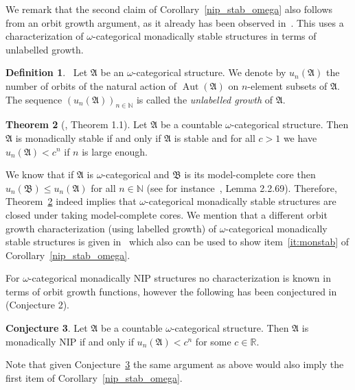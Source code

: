 \documentclass{amsart}
\theoremstyle{definition}
\newtheorem{theorem}{Theorem}[section]
\newtheorem{definition}[theorem]{Definition}
\newtheorem{conjecture}[theorem]{Conjecture}
\theoremstyle{remark}
\numberwithin{equation}{section}
\newcommand{\aut}{\operatorname{Aut}}
\newcommand{\fa}{\mathfrak{A}}
\newcommand{\fb}{\mathfrak{B}}
\begin{document}
	We remark that the second claim of Corollary~\ref{nip_stab_omega} also follows from an orbit growth argument, as it already has been observed in~\cite{bodor2024classification}. This uses a characterization of $\omega$-categorical monadically stable structures in terms of unlabelled growth.
	
\begin{definition}~\label{def:lu}
	Let $\fa$ be an $\omega$-categorical structure. We denote by $u_n(\fa)$ the number of orbits of the natural action of $\aut(\fa)$ on $n$-element subsets of $\fa$. The sequence $(u_n(\fa))_{n\in \mathbb{N}}$ is called the \emph{unlabelled growth} of $\fa$.
\end{definition}

\begin{theorem}[\cite{braunfeld2022monadic}, Theorem 1.1]\label{hereditarily_cellular}
	Let $\fa$ be a countable $\omega$-categorical structure. Then $\fa$ is monadically stable if and only if $\fa$ is stable and for all $c>1$ we have $u_n(\fa)<c^n$ if $n$ is large enough.
\end{theorem}

	We know that if $\fa$ is $\omega$-categorical and $\fb$ is its model-complete core then $u_n(\fb)\leq u_n(\fa)$ for all $n\in \mathbb{N}$ (see for instance~\cite{bodor2022csp}, Lemma 2.2.69). Therefore, Theorem~\ref{hereditarily_cellular} indeed implies that $\omega$-categorical monadically stable structures are closed under taking model-complete cores. We mention that a different orbit growth characterization (using labelled growth) of $\omega$-categorical monadically stable structures is given in~\cite{bodor2025labelled} which also can be used to show item~\ref{it:monstab} of Corollary~\ref{nip_stab_omega}.
	
	For $\omega$-categorical monadically $\mathrm{NIP}$ structures no characterization is known in terms of orbit growth functions, however the following has been conjectured in~\cite{braunfeld2022monadic} (Conjecture 2).
	
\begin{conjecture}\label{conj:sam}
	Let $\fa$ be a countable $\omega$-categorical structure. Then $\fa$ is monadically $\mathrm{NIP}$ if and only if $u_n(\fa)<c^n$ for some $c\in \mathbb{R}$.
\end{conjecture}

	Note that given Conjecture~\ref{conj:sam} the same argument as above would also imply the first item of Corollary~\ref{nip_stab_omega}.
	
\end{document}
